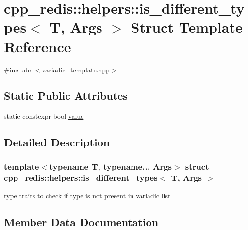 \hypertarget{structcpp__redis_1_1helpers_1_1is__different__types}{}\section{cpp\+\_\+redis\+:\+:helpers\+:\+:is\+\_\+different\+\_\+types$<$ T, Args $>$ Struct Template Reference}
\label{structcpp__redis_1_1helpers_1_1is__different__types}


{\ttfamily \#include $<$variadic\+\_\+template.\+hpp$>$}

\subsection*{Static Public Attributes}
\begin{DoxyCompactItemize}
\item 
static constexpr bool \mbox{\hyperlink{structcpp__redis_1_1helpers_1_1is__different__types_a07dadd8ff3c8024734f231aaf1555626}{value}}
\end{DoxyCompactItemize}


\subsection{Detailed Description}
\subsubsection*{template$<$typename T, typename... Args$>$\newline
struct cpp\+\_\+redis\+::helpers\+::is\+\_\+different\+\_\+types$<$ T, Args $>$}

type traits to check if type is not present in variadic list 

\subsection{Member Data Documentation}
\mbox{\label{structcpp__redis_1_1helpers_1_1is__different__types_a07dadd8ff3c8024734f231aaf1555626}} 

